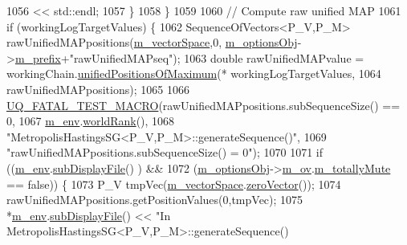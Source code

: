 \begin{DoxyCode}
1056                                 << std::endl;
1057       \}
1058     \}
1059 
1060     \textcolor{comment}{// Compute raw unified MAP}
1061     \textcolor{keywordflow}{if} (workingLogTargetValues) \{
1062       SequenceOfVectors<P\_V,P\_M> rawUnifiedMAPpositions(\hyperlink{class_q_u_e_s_o_1_1_metropolis_hastings_s_g_a2ef17fbfc6a156f03bbfad044b5a75f5}{m\_vectorSpace},0,
      \hyperlink{class_q_u_e_s_o_1_1_metropolis_hastings_s_g_a5d0bc9f73d50d272aa6bfb5ef5939ef3}{m\_optionsObj}->\hyperlink{class_q_u_e_s_o_1_1_metropolis_hastings_s_g_options_a4f7c510aaa530336d24259e2a89f5d0b}{m\_prefix}+\textcolor{stringliteral}{"rawUnifiedMAPseq"});
1063       \textcolor{keywordtype}{double} rawUnifiedMAPvalue = workingChain.\hyperlink{class_q_u_e_s_o_1_1_base_vector_sequence_a4269482101b2bcdb1975543f8191ab4c}{unifiedPositionsOfMaximum}(*
      workingLogTargetValues,
1064                                                                          rawUnifiedMAPpositions);
1065 
1066       \hyperlink{_defines_8h_a56d63d18d0a6d45757de47fcc06f574d}{UQ\_FATAL\_TEST\_MACRO}(rawUnifiedMAPpositions.subSequenceSize() == 0,
1067                           \hyperlink{class_q_u_e_s_o_1_1_metropolis_hastings_s_g_ac8ea061e55b920e0c8f9bce5c3f20e52}{m\_env}.\hyperlink{class_q_u_e_s_o_1_1_base_environment_a78b57112bbd0e6dd0e8afec00b40ffa7}{worldRank}(),
1068                           \textcolor{stringliteral}{"MetropolisHastingsSG<P\_V,P\_M>::generateSequence()"},
1069                           \textcolor{stringliteral}{"rawUnifiedMAPpositions.subSequenceSize() = 0"});
1070 
1071       \textcolor{keywordflow}{if} ((\hyperlink{class_q_u_e_s_o_1_1_metropolis_hastings_s_g_ac8ea061e55b920e0c8f9bce5c3f20e52}{m\_env}.\hyperlink{class_q_u_e_s_o_1_1_base_environment_a8a0064746ae8dddfece4229b9ad374d6}{subDisplayFile}()                   ) &&
1072           (\hyperlink{class_q_u_e_s_o_1_1_metropolis_hastings_s_g_a5d0bc9f73d50d272aa6bfb5ef5939ef3}{m\_optionsObj}->\hyperlink{class_q_u_e_s_o_1_1_metropolis_hastings_s_g_options_a9d4792d9fc2dc5439b8ab489b0c236eb}{m\_ov}.\hyperlink{class_q_u_e_s_o_1_1_mh_options_values_af812309e81191e88dfdc87c5815141a3}{m\_totallyMute} == \textcolor{keyword}{false})) \{
1073         P\_V tmpVec(\hyperlink{class_q_u_e_s_o_1_1_metropolis_hastings_s_g_a2ef17fbfc6a156f03bbfad044b5a75f5}{m\_vectorSpace}.\hyperlink{class_q_u_e_s_o_1_1_vector_space_a92e963bb5cab3eecd290dfe4b8f03b04}{zeroVector}());
1074         rawUnifiedMAPpositions.getPositionValues(0,tmpVec);
1075         *\hyperlink{class_q_u_e_s_o_1_1_metropolis_hastings_s_g_ac8ea061e55b920e0c8f9bce5c3f20e52}{m\_env}.\hyperlink{class_q_u_e_s_o_1_1_base_environment_a8a0064746ae8dddfece4229b9ad374d6}{subDisplayFile}() << \textcolor{stringliteral}{"In MetropolisHastingsSG<P\_V,P\_M>::generateSequence()
}
\end{DoxyCode}
